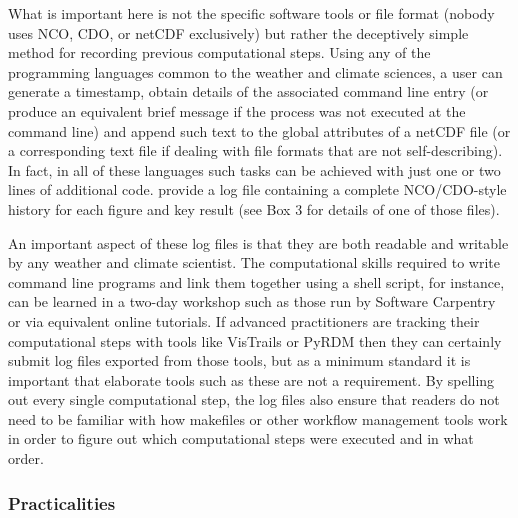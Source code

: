 What is important here is not the specific software tools or file format (nobody uses NCO, CDO, or netCDF exclusively) but rather the deceptively simple method for recording previous computational steps. Using any of the programming languages common to the weather and climate sciences, a user can generate a timestamp, obtain details of the associated command line entry (or produce an equivalent brief message if the process was not executed at the command line) and append such text to the global attributes of a netCDF file (or a corresponding text file if dealing with file formats that are not self-describing). In fact, in all of these languages such tasks can be achieved with just one or two lines of additional code. \citet{Irving2015} provide a log file containing a complete NCO/CDO-style history for each figure and key result (see Box 3 for details of one of those files).

An important aspect of these log files is that they are both readable and writable by any weather and climate scientist. The computational skills required to write command line programs and link them together using a shell script, for instance, can be learned in a two-day workshop such as those run by Software Carpentry \citep{Wilson2014} or via equivalent online tutorials. If advanced practitioners are tracking their computational steps with tools like VisTrails or PyRDM then they can certainly submit log files exported from those tools, but as a minimum standard it is important that elaborate tools such as these are not a requirement. By spelling out every single computational step, the log files also ensure that readers do not need to be familiar with how makefiles or other workflow management tools work in order to figure out which computational steps were executed and in what order. 

\subsubsection{Practicalities}


